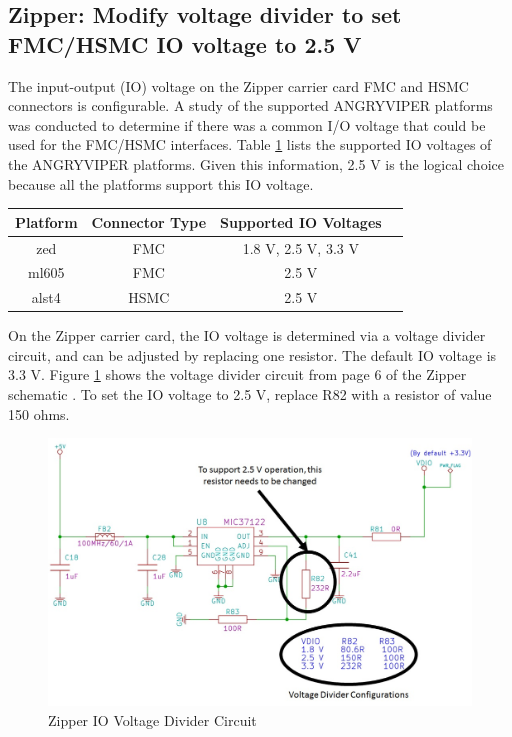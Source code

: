 \documentclass{article}
\begin{document}
\subsection*{Zipper: Modify voltage divider to set FMC/HSMC IO voltage to 2.5 V}
The input-output (IO) voltage on the Zipper carrier card FMC and HSMC connectors is configurable. A study of the supported ANGRYVIPER platforms was conducted to determine if there was a common I/O voltage that could be used for the FMC/HSMC interfaces. Table \ref{table:io_voltages} lists the supported IO voltages of the ANGRYVIPER platforms. Given this information, 2.5 V is the logical choice because all the platforms support this IO voltage.\par\smallskip
		\begin{table}[h]
			\begin{center}
				\scriptsize
  				\begin{tabular}{|c|c|c|c|}
    			\hline
    			\rowcolor{blue}
    			Platform & Connector Type & Supported IO Voltages\\
    			\hline
    			zed & FMC & 1.8 V, 2.5 V, 3.3 V\\
    			\hline
    			ml605 & FMC & 2.5 V\\
    			\hline
    			alst4 & HSMC & 2.5 V\\
    			\hline
   				\end{tabular}
				\label{table:io_voltages}
		  	\end{center}
   		\end{table}
\normalsize
\noindent On the Zipper carrier card, the IO voltage is determined via a voltage divider circuit, and can be adjusted by replacing one resistor. The default IO voltage is 3.3 V. Figure \ref{fig:zipper_voltage_divider} shows the voltage divider circuit from page 6 of the Zipper schematic \cite{zipper_sch}. To set the IO voltage to 2.5 V, replace R82 with a resistor of value 150 ohms.\par\smallskip
	\begin{figure}[ht]
		\begin{center}
		\includegraphics[scale=0.4]{zipper_voltage_divider}
		\caption{Zipper IO Voltage Divider Circuit}
		\label{fig:zipper_voltage_divider}
		\end{center}
	\end{figure}
\end{document}
